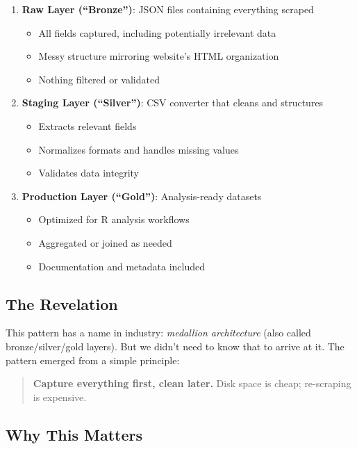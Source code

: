 \documentclass[11pt,a4paper]{article}
\begin{document}
\begin{enumerate}
    \item \textbf{Raw Layer (``Bronze'')}: JSON files containing everything scraped
    \begin{itemize}
        \item All fields captured, including potentially irrelevant data
        \item Messy structure mirroring website's HTML organization
        \item Nothing filtered or validated
    \end{itemize}

    \item \textbf{Staging Layer (``Silver'')}: CSV converter that cleans and structures
    \begin{itemize}
        \item Extracts relevant fields
        \item Normalizes formats and handles missing values
        \item Validates data integrity
    \end{itemize}

    \item \textbf{Production Layer (``Gold'')}: Analysis-ready datasets
    \begin{itemize}
        \item Optimized for R analysis workflows
        \item Aggregated or joined as needed
        \item Documentation and metadata included
    \end{itemize}
\end{enumerate}

\subsection{The Revelation}

This pattern has a name in industry: \textit{medallion architecture} (also called bronze/silver/gold layers). But we didn't need to know that to arrive at it. The pattern emerged from a simple principle:

\begin{quote}
\textbf{Capture everything first, clean later.} Disk space is cheap; re-scraping is expensive.
\end{quote}

\subsection{Why This Matters}
\end{document}
